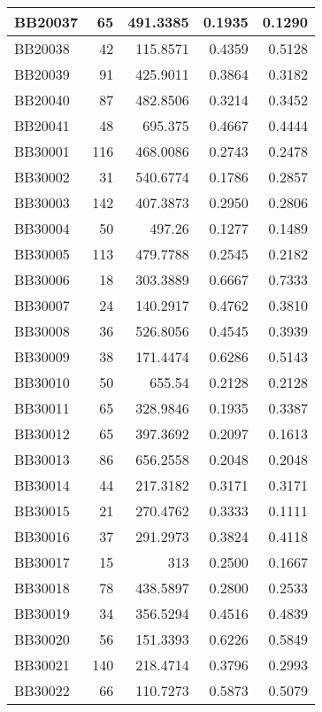 \begin{longtable}{|l|r|r||r|r|}
	\hline
	BB20037 & 65    & 491.3385 & 0.1935 & 0.1290 \\
	\hline
	BB20038 & 42    & 115.8571 & 0.4359 & 0.5128 \\
	\hline
	BB20039 & 91    & 425.9011 & 0.3864 & 0.3182 \\
	\hline
	BB20040 & 87    & 482.8506 & 0.3214 & 0.3452 \\
	\hline
	BB20041 & 48    & 695.375 & 0.4667 & 0.4444 \\
	\hline
	BB30001 & 116   & 468.0086 & 0.2743 & 0.2478 \\
	\hline
	BB30002 & 31    & 540.6774 & 0.1786 & 0.2857 \\
	\hline
	BB30003 & 142   & 407.3873 & 0.2950 & 0.2806 \\
	\hline
	BB30004 & 50    & 497.26 & 0.1277 & 0.1489 \\
	\hline
	BB30005 & 113   & 479.7788 & 0.2545 & 0.2182 \\
	\hline
	BB30006 & 18    & 303.3889 & 0.6667 & 0.7333 \\
	\hline
	BB30007 & 24    & 140.2917 & 0.4762 & 0.3810 \\
	\hline
	BB30008 & 36    & 526.8056 & 0.4545 & 0.3939 \\
	\hline
	BB30009 & 38    & 171.4474 & 0.6286 & 0.5143 \\
	\hline
	BB30010 & 50    & 655.54 & 0.2128 & 0.2128 \\
	\hline
	BB30011 & 65    & 328.9846 & 0.1935 & 0.3387 \\
	\hline
	BB30012 & 65    & 397.3692 & 0.2097 & 0.1613 \\
	\hline
	BB30013 & 86    & 656.2558 & 0.2048 & 0.2048 \\
	\hline
	BB30014 & 44    & 217.3182 & 0.3171 & 0.3171 \\
	\hline
	BB30015 & 21    & 270.4762 & 0.3333 & 0.1111 \\
	\hline
	BB30016 & 37    & 291.2973 & 0.3824 & 0.4118 \\
	\hline
	BB30017 & 15    & 313   & 0.2500 & 0.1667 \\
	\hline
	BB30018 & 78    & 438.5897 & 0.2800 & 0.2533 \\
	\hline
	BB30019 & 34    & 356.5294 & 0.4516 & 0.4839 \\
	\hline
	BB30020 & 56    & 151.3393 & 0.6226 & 0.5849 \\
	\hline
	BB30021 & 140   & 218.4714 & 0.3796 & 0.2993 \\
	\hline
	BB30022 & 66    & 110.7273 & 0.5873 & 0.5079 \\

\end{longtable}
